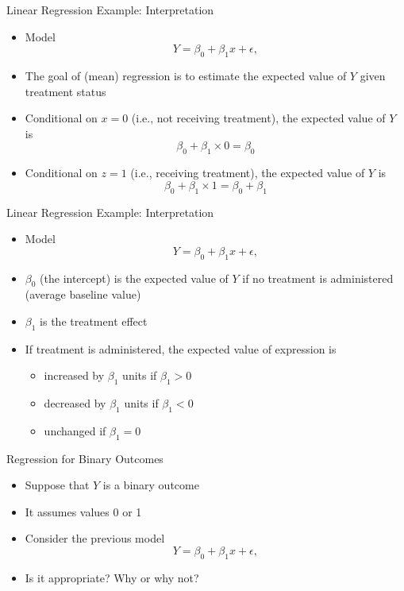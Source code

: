 \documentclass[xcolor=x11names,compress]{beamer}\usepackage[]{graphicx}\usepackage[]{color}
\begin{document}
\begin{frame}{Linear Regression Example: Interpretation}
  \begin{itemize}
  \item Model
    \begin{equation*}
      Y=\beta_0+\beta_1 x + \epsilon,
    \end{equation*}
\item The goal of (mean) regression is to estimate the expected value of $Y$ given treatment status
  \item Conditional on $x=0$ (i.e., not receiving treatment), the expected value of $Y$ is
    \begin{equation*}
      \beta_0 + \beta_1 \times 0 =\beta_0
    \end{equation*}
  \item Conditional on $z=1$ (i.e., receiving treatment), the expected value of $Y$ is
    \begin{equation*}
      \beta_0 + \beta_1 \times 1 =\beta_0+\beta_1
    \end{equation*}
    \end{itemize}
    
\end{frame}
\begin{frame}{Linear Regression Example: Interpretation}
  \begin{itemize}
  \item Model
    \begin{equation*}
      Y=\beta_0+\beta_1 x + \epsilon,
    \end{equation*}
\item $\beta_0$ (the intercept) is the expected value of $Y$ if no treatment is administered (average baseline value)
\item $\beta_1$ is the treatment effect
\item If treatment is administered, the expected value of expression is 
  \begin{itemize}
  \item increased by $\beta_1$ units if $\beta_1>0$
  \item decreased by $\beta_1$ units if $\beta_1<0$
  \item unchanged if $\beta_1=0$
  \end{itemize}
    \end{itemize}
    
\end{frame}


\begin{frame}{Regression for Binary Outcomes}
  \begin{itemize}
  \item Suppose that $Y$ is a binary outcome
  \item It assumes values 0 or 1
  \item Consider the previous model
    \begin{equation*}
      Y=\beta_0+\beta_1 x + \epsilon,
    \end{equation*}
  \item Is it appropriate? Why or why not?
  \end{itemize}
\end{frame}
\end{document}
